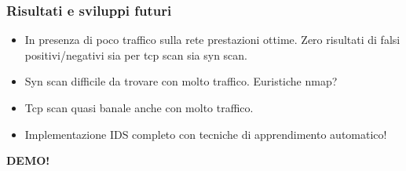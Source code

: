 \documentclass{beamer}
\begin{document}
\begin{frame}
\frametitle{Risultati e sviluppi futuri}

\begin{itemize}[<+->]
\item In presenza di poco traffico sulla rete prestazioni ottime. Zero risultati di falsi positivi/negativi
sia per tcp scan sia syn scan.
\item Syn scan difficile da trovare con molto traffico. Euristiche nmap? 
\item Tcp scan quasi banale anche con molto traffico.
\item Implementazione IDS completo con tecniche di apprendimento automatico!
\end{itemize}

\end{frame}




\begin{frame}
\begin{center}
{\huge \textbf{DEMO!}}
\end{center}
\end{frame}
\end{document}
